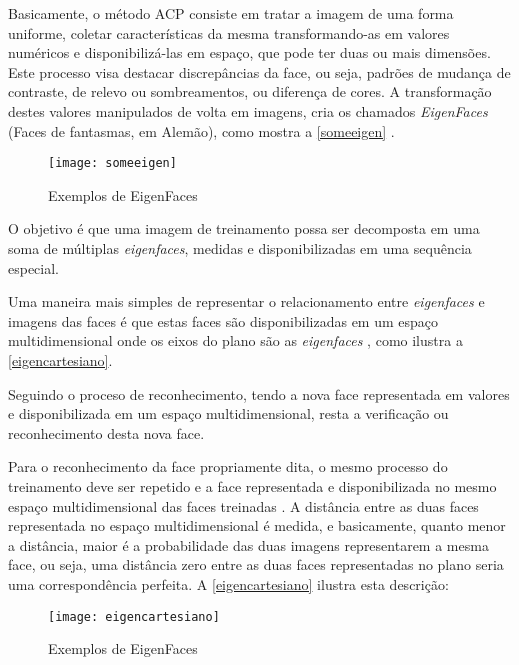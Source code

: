 Basicamente, o método ACP consiste em tratar a imagem de uma forma uniforme, coletar características da mesma transformando-as em valores numéricos e disponibilizá-las em espaço, que pode ter duas ou mais dimensões. Este processo visa destacar discrepâncias da face, ou seja, padrões de mudança de contraste, de relevo ou sombreamentos, ou diferença de cores. A transformação destes valores manipulados de volta em imagens, cria os chamados \textit{EigenFaces} (Faces de fantasmas, em Alemão), como mostra a \autoref{someeigen} \cite{drmathew_java_programming}.

\begin{figure}[h]
	\centering
	\texttt{[image: someeigen]}
	\caption{Exemplos de EigenFaces}
	\label{someeigen}
\end{figure}

O objetivo é que uma imagem de treinamento possa ser decomposta em uma soma de múltiplas \textit{eigenfaces}, medidas e disponibilizadas em uma sequência especial.

Uma maneira mais simples de representar o relacionamento entre \textit{eigenfaces} e imagens das faces é que estas faces são disponibilizadas em um espaço multidimensional onde os eixos do plano são as \textit{eigenfaces} \cite{drmathew_java_programming}, como ilustra a  \autoref{eigencartesiano}.

Seguindo o proceso de reconhecimento, tendo a nova face representada em valores e disponibilizada em um espaço multidimensional, resta a verificação ou reconhecimento desta nova face.

Para o reconhecimento da face propriamente dita, o mesmo processo do treinamento deve ser repetido e a face representada e disponibilizada no mesmo espaço multidimensional das faces treinadas \cite{drmathew_java_programming}. A distância entre as duas faces representada no espaço multidimensional é medida, e basicamente, quanto menor a distância, maior é a probabilidade das duas imagens representarem a mesma face, ou seja, uma distância zero entre as duas faces representadas no plano seria uma correspondência perfeita. A \autoref{eigencartesiano} ilustra esta descrição:

\begin{figure}[h]
	\centering
	\texttt{[image: eigencartesiano]}
	\caption{Exemplos de EigenFaces}
	\label{eigencartesiano}
\end{figure}

